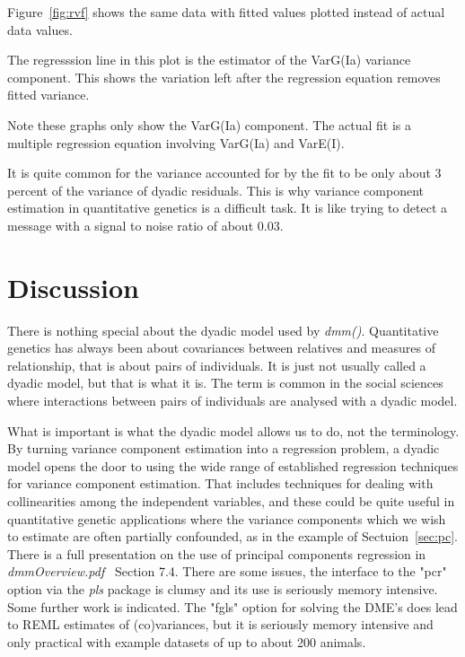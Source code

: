 \documentclass[titlepage,a4paper,12pt]{article}  %
\begin{document}
Figure~\ref{fig:rvf} shows the same data with fitted values plotted instead of actual data values.

The regresssion line in this plot is the estimator of the VarG(Ia) variance component. 
This shows the variation left after the regression equation removes fitted variance. 

Note these graphs only show the VarG(Ia) component. The actual fit is a multiple regression equation involving VarG(Ia) and VarE(I).

It is quite common for the variance accounted for by the fit to be only about 3 percent of the variance of dyadic residuals.  This is why variance component estimation in quantitative genetics is a difficult task. It is like trying to detect a message with a signal to noise ratio of about $0.03$.

\section{Discussion}
There is nothing special about the dyadic model used by {\em dmm()}. Quantitative genetics has always been about covariances between relatives and measures of relationship, that is about pairs of individuals. It is just not usually called a dyadic model, but that is what it is. The term is common in the social sciences where interactions between pairs of individuals  are analysed with a dyadic model.

What is important is what the dyadic model allows us to do, not the terminology. By turning variance component estimation into a regression problem, a dyadic model opens the door to using the wide range of established regression techniques for variance component estimation. That includes techniques for dealing with collinearities among the independent variables, and these could be quite useful in quantitative genetic applications where the variance components which we wish to estimate are often partially confounded, as in the example of Sectuion~\ref{sec:pc}. There is a full presentation on the use of principal components regression in {\em dmmOverview.pdf}~\cite{jack:15} Section 7.4. There are some issues, the interface to the "pcr" option via the {\em pls} package is clumsy and its use is seriously memory intensive. Some further work is indicated.
The "fgls" option for solving the DME's does lead to REML estimates of (co)variances, but it is seriously memory intensive and only practical with example datasets of up to about 200 animals.
\end{document}
